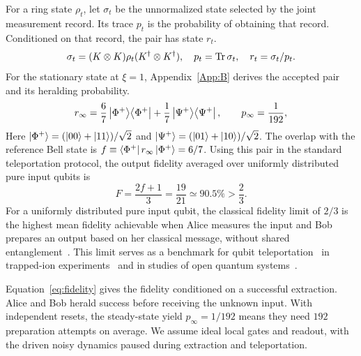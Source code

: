 \documentclass[aps,prl,reprint,amsmath,amssymb,floatfix,superscriptaddress]{revtex4-2}
\begin{document}
For a ring state $\rho_t$, let $\sigma_t$ be the unnormalized state selected by the joint measurement record. Its trace $p_t$ is the probability of obtaining that record. Conditioned on that record, the pair has state $r_t$.
\begin{equation}
\sigma_t=(K\otimes K)\rho_t(K^\dagger\otimes K^\dagger),\quad
p_t=\Tr\sigma_t,\quad r_t=\sigma_t/p_t.
\label{eq:pair}
\end{equation}
For the stationary state at $\xi=1$, Appendix~\ref{App:B} derives the accepted pair and its heralding probability.
\begin{equation}
r_\infty=\frac67\ket{\Phi^+}\!\bra{\Phi^+}+\frac17\ket{\Psi^+}\!\bra{\Psi^+},\qquad p_\infty=\frac1{192},
\label{eq:pair12}
\end{equation}
Here $\ket{\Phi^+}=(\ket{00}+\ket{11})/\sqrt2$ and $\ket{\Psi^+}=(\ket{01}+\ket{10})/\sqrt2$. The overlap with the reference Bell state is $f\equiv \bra{\Phi^+}r_\infty\ket{\Phi^+}=6/7$. Using this pair in the standard teleportation protocol, the output fidelity averaged over uniformly distributed pure input qubits is~\cite{Teleportation1999}
\begin{equation}
F=\frac{2f+1}{3}=\frac{19}{21}\simeq90.5\%>\frac23.
\label{eq:fidelity}
\end{equation}
For a uniformly distributed pure input qubit, the classical fidelity limit of $2/3$ is the highest mean fidelity achievable when Alice measures the input and Bob prepares an output based on her classical message, without shared entanglement~\cite{Teleportation1999}. This limit serves as a benchmark for qubit teleportation~\cite{Pirandola2015Teleportation} in trapped-ion experiments~\cite{Barrett2004Teleportation,Riebe2004Teleportation,Olmschenk2009Teleportation} and in studies of open quantum systems~\cite{Yan2025Teleportation}.

Equation~\eqref{eq:fidelity} gives the fidelity conditioned on a successful extraction. Alice and Bob herald success before receiving the unknown input. With independent resets, the steady-state yield $p_\infty=1/192$ means they need $192$ preparation attempts on average. We assume ideal local gates and readout, with the driven noisy dynamics paused during extraction and teleportation.
\end{document}
